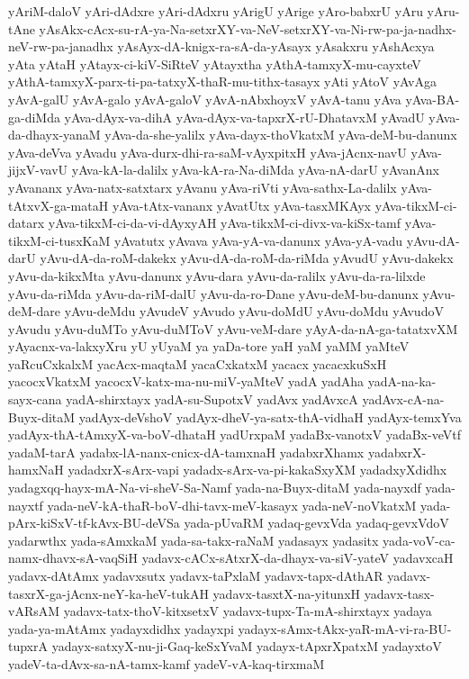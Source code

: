 {yAriM-daloV
yAri-dAdxre
yAri-dAdxru
yArigU
yArige
yAro-babxrU
yAru
yAru-tAne
yAsAkx-cAcx-su-rA-ya-Na-setxrXY-va-NeV-setxrXY-va-Ni-rw-pa-ja-nadhx-neV-rw-pa-janadhx
yAsAyx-dA-knigx-ra-sA-da-yAsayx
yAsakxru
yAshAcxya
yAta
yAtaH
yAtayx-ci-kiV-SiRteV
yAtayxtha
yAthA-tamxyX-mu-cayxteV
yAthA-tamxyX-parx-ti-pa-tatxyX-thaR-mu-tithx-tasayx
yAti
yAtoV
yAvAga
yAvA-galU
yAvA-galo
yAvA-galoV
yAvA-nAbxhoyxV
yAvA-tanu
yAva
yAva-BA-ga-diMda
yAva-dAyx-va-dihA
yAva-dAyx-va-tapxrX-rU-DhatavxM
yAvadU
yAva-da-dhayx-yanaM
yAva-da-she-yalilx
yAva-dayx-thoVkatxM
yAva-deM-bu-danunx
yAva-deVva
yAvadu
yAva-durx-dhi-ra-saM-vAyxpitxH
yAva-jAcnx-navU
yAva-jijxV-vavU
yAva-kA-la-dalilx
yAva-kA-ra-Na-diMda
yAva-nA-darU
yAvanAnx
yAvananx
yAva-natx-satxtarx
yAvanu
yAva-riVti
yAva-sathx-La-dalilx
yAva-tAtxvX-ga-mataH
yAva-tAtx-vananx
yAvatUtx
yAva-tasxMKAyx
yAva-tikxM-ci-datarx
yAva-tikxM-ci-da-vi-dAyxyAH
yAva-tikxM-ci-divx-va-kiSx-tamf
yAva-tikxM-ci-tusxKaM
yAvatutx
yAvava
yAva-yA-va-danunx
yAva-yA-vadu
yAvu-dA-darU
yAvu-dA-da-roM-dakekx
yAvu-dA-da-roM-da-riMda
yAvudU
yAvu-dakekx
yAvu-da-kikxMta
yAvu-danunx
yAvu-dara
yAvu-da-ralilx
yAvu-da-ra-lilxde
yAvu-da-riMda
yAvu-da-riM-dalU
yAvu-da-ro-Dane
yAvu-deM-bu-danunx
yAvu-deM-dare
yAvu-deMdu
yAvudeV
yAvudo
yAvu-doMdU
yAvu-doMdu
yAvudoV
yAvudu
yAvu-duMTo
yAvu-duMToV
yAvu-veM-dare
yAyA-da-nA-ga-tatatxvXM
yAyacnx-va-lakxyXru
yU
yUyaM
ya
yaDa-tore
yaH
yaM
yaMM
yaMteV
yaRcuCxkalxM
yacAcx-maqtaM
yacaCxkatxM
yacacx
yacacxkuSxH
yacocxVkatxM
yacocxV-katx-ma-nu-miV-yaMteV
yadA
yadAha
yadA-na-ka-sayx-cana
yadA-shirxtayx
yadA-su-SupotxV
yadAvx
yadAvxcA
yadAvx-cA-na-Buyx-ditaM
yadAyx-deVshoV
yadAyx-dheV-ya-satx-thA-vidhaH
yadAyx-temxYva
yadAyx-thA-tAmxyX-va-boV-dhataH
yadUrxpaM
yadaBx-vanotxV
yadaBx-veVtf
yadaM-tarA
yadabx-lA-nanx-cnicx-dA-tamxnaH
yadabxrXhamx
yadabxrX-hamxNaH
yadadxrX-sArx-vapi
yadadx-sArx-va-pi-kakaSxyXM
yadadxyXdidhx
yadagxqq-hayx-mA-Na-vi-sheV-Sa-Namf
yada-na-Buyx-ditaM
yada-nayxdf
yada-nayxtf
yada-neV-kA-thaR-boV-dhi-tavx-meV-kasayx
yada-neV-noVkatxM
yada-pArx-kiSxV-tf-kAvx-BU-deVSa
yada-pUvaRM
yadaq-gevxVda
yadaq-gevxVdoV
yadarwthx
yada-sAmxkaM
yada-sa-takx-raNaM
yadasayx
yadasitx
yada-voV-ca-namx-dhavx-sA-vaqSiH
yadavx-cACx-sAtxrX-da-dhayx-va-siV-yateV
yadavxcaH
yadavx-dAtAmx
yadavxsutx
yadavx-taPxlaM
yadavx-tapx-dAthAR
yadavx-tasxrX-ga-jAcnx-neY-ka-heV-tukAH
yadavx-tasxtX-na-yitunxH
yadavx-tasx-vARsAM
yadavx-tatx-thoV-kitxsetxV
yadavx-tupx-Ta-mA-shirxtayx
yadaya
yada-ya-mAtAmx
yadayxdidhx
yadayxpi
yadayx-sAmx-tAkx-yaR-mA-vi-ra-BU-tupxrA
yadayx-satxyX-nu-ji-Gaq-keSxYvaM
yadayx-tApxrXpatxM
yadayxtoV
yadeV-ta-dAvx-sa-nA-tamx-kamf
yadeV-vA-kaq-tirxmaM
}
